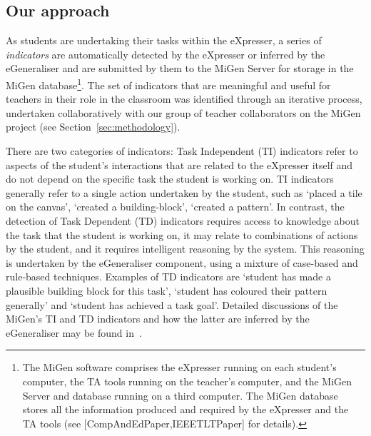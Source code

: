 \subsection{Our approach}
\label{sec:our-approach}
 
As students are undertaking their tasks within the eXpresser, a series
of {\em indicators} are automatically detected by the eXpresser or
inferred by the eGeneraliser and are submitted by them to the MiGen
Server for storage in the MiGen database\footnote{The MiGen software
  comprises the eXpresser running on each student’s computer, the TA
  tools running on the teacher’s computer, and the MiGen Server and
  database running on a third computer. The MiGen database stores all
  the information produced and required by the eXpresser and the TA
  tools (see [CompAndEdPaper,IEEETLTPaper] for details).}.   
The set of indicators that are meaningful and useful for teachers in
their role in the classroom was identified through an iterative
process, undertaken collaboratively with our group of teacher
collaborators on the MiGen project (see Section~\ref{sec:methodology}).  

There are two categories of indicators: Task Independent (TI)
indicators refer to aspects of the student’s interactions that are
related to the eXpresser itself and do not depend on the specific task
the student is working on. TI indicators generally refer to a single
action undertaken by the student, such as ‘placed a tile on the
canvas’, ‘created a building-block’, ‘created a pattern’. In contrast,
the detection of Task Dependent (TD) indicators requires access to
knowledge about the task that the student is working on, it may relate
to combinations of actions by the student, and it requires intelligent
reasoning by the system. This reasoning is undertaken by the
eGeneraliser component, using a mixture of case-based and rule-based
techniques. Examples of TD indicators are `student has made a
plausible building block for this task’, ‘student has coloured their
pattern generally’ and `student has achieved a task goal'. Detailed
discussions of the MiGen's TI and TD indicators and how the latter are
inferred by the eGeneraliser may be found in~\cite{IEEETLTPaper}.
 
